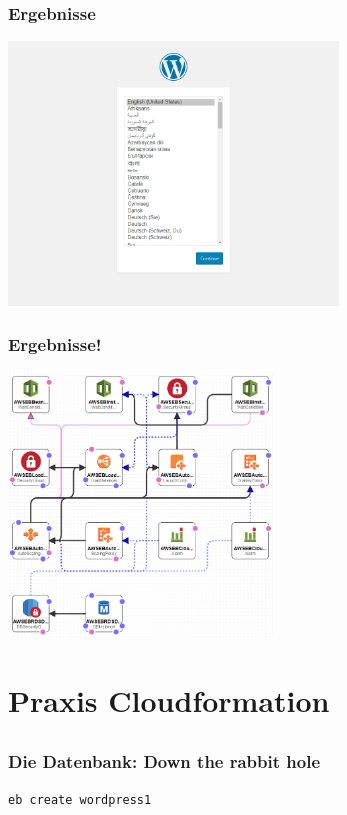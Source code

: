 \documentclass[aspectratio=169,grey,smaller]{beamer}
\begin{document}
\begin{frame}
\frametitle{Ergebnisse}
  \begin{center}
  \includegraphics[height=7cm]{wordpress}
  \end{center}
\end{frame}

\begin{frame}
\frametitle{Ergebnisse!}
  \begin{center}
  \includegraphics[height=7cm]{stack}
  \end{center}
\end{frame}

\section{Praxis Cloudformation}
\subsection{}

\begin{frame}
\frametitle{Die Datenbank: Down the rabbit hole}
  \begin{center}
  \texttt{eb create  wordpress1}
  
  \vspace{3mm}
  
  
  \vspace{3mm}
  
  \end{center}
\end{frame}
\end{document}
